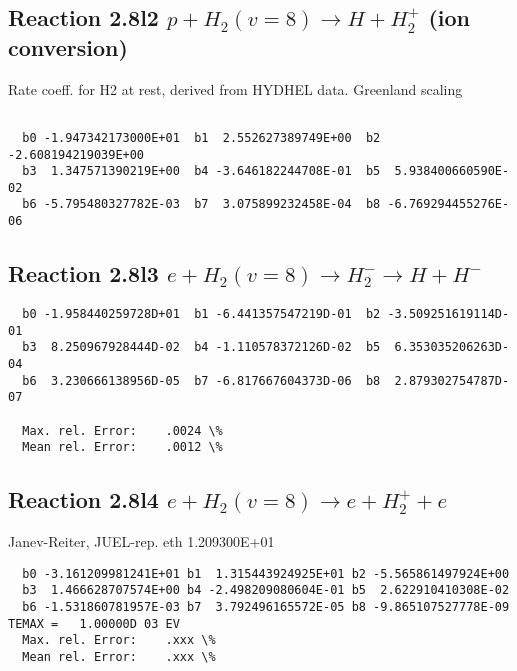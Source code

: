 \documentclass[12pt,dvipdfmx]{article}
\begin{document}
\subsection{
Reaction 2.8l2
$ p + H_2(v=8) \rightarrow H + H_2^+$ (ion conversion)
}
Rate coeff. for H2 at rest, derived from HYDHEL data. Greenland scaling


\begin{small}\begin{verbatim}

  b0 -1.947342173000E+01  b1  2.552627389749E+00  b2 -2.608194219039E+00
  b3  1.347571390219E+00  b4 -3.646182244708E-01  b5  5.938400660590E-02
  b6 -5.795480327782E-03  b7  3.075899232458E-04  b8 -6.769294455276E-06

\end{verbatim}\end{small}

\newpage

\subsection{
Reaction 2.8l3
 $ e + H_2(v=8) \rightarrow H_2^- \rightarrow H + H^-$
}


\begin{small}\begin{verbatim}
  b0 -1.958440259728D+01  b1 -6.441357547219D-01  b2 -3.509251619114D-01
  b3  8.250967928444D-02  b4 -1.110578372126D-02  b5  6.353035206263D-04
  b6  3.230666138956D-05  b7 -6.817667604373D-06  b8  2.879302754787D-07

  Max. rel. Error:    .0024 \%
  Mean rel. Error:    .0012 \%
\end{verbatim}\end{small}
\subsection{
Reaction 2.8l4
 $ e + H_2(v=8) \rightarrow e + H_2^+  + e$
}
Janev-Reiter, JUEL-rep. eth 1.209300E+01

\begin{small}\begin{verbatim}
  b0 -3.161209981241E+01 b1  1.315443924925E+01 b2 -5.565861497924E+00
  b3  1.466628707574E+00 b4 -2.498209080604E-01 b5  2.622910410308E-02
  b6 -1.531860781957E-03 b7  3.792496165572E-05 b8 -9.865107527778E-09
TEMAX =   1.00000D 03 EV
  Max. rel. Error:    .xxx \%
  Mean rel. Error:    .xxx \%
\end{verbatim}\end{small}
\end{document}
